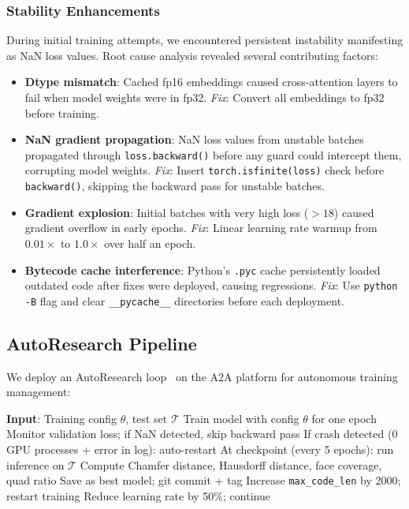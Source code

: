 \documentclass[conference]{IEEEtran}
\begin{document}
\subsubsection{Stability Enhancements}

During initial training attempts, we encountered persistent instability manifesting as NaN loss values.
Root cause analysis revealed several contributing factors:

\begin{itemize}
\item \textbf{Dtype mismatch}: Cached fp16 embeddings caused cross-attention layers to fail when model weights were in fp32. \textit{Fix}: Convert all embeddings to fp32 before training.
\item \textbf{NaN gradient propagation}: NaN loss values from unstable batches propagated through \texttt{loss.backward()} before any guard could intercept them, corrupting model weights. \textit{Fix}: Insert \texttt{torch.isfinite(loss)} check before \texttt{backward()}, skipping the backward pass for unstable batches.
\item \textbf{Gradient explosion}: Initial batches with very high loss ($>18$) caused gradient overflow in early epochs. \textit{Fix}: Linear learning rate warmup from $0.01\times$ to $1.0\times$ over half an epoch.
\item \textbf{Bytecode cache interference}: Python's \texttt{.pyc} cache persistently loaded outdated code after fixes were deployed, causing regressions. \textit{Fix}: Use \texttt{python -B} flag and clear \texttt{\_\_pycache\_\_} directories before each deployment.
\end{itemize}

\subsection{AutoResearch Pipeline}

We deploy an AutoResearch loop~\cite{karpathy2026autoresearch} on the A2A platform for autonomous training management:

\begin{algorithmic}
\STATE \textbf{Input}: Training config $\theta$, test set $\mathcal{T}$
\LOOP
\STATE Train model with config $\theta$ for one epoch
\STATE Monitor validation loss; if NaN detected, skip backward pass
\STATE If crash detected (0 GPU processes + error in log): auto-restart
\STATE At checkpoint (every 5 epochs): run inference on $\mathcal{T}$
\STATE Compute Chamfer distance, Hausdorff distance, face coverage, quad ratio
\STATE {}
    \STATE Save as best model; git commit + tag
    \STATE Increase \texttt{max\_code\_len} by 2000; restart training
    \STATE Reduce learning rate by 50\%; continue
\ENDIF
\ENDLOOP
\end{algorithmic}
\end{document}
